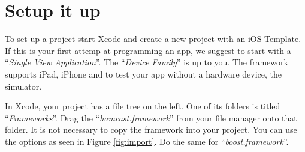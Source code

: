 \section{Setup it up}
\label{sec:setup}

To set up a project start Xcode and create a new project with an iOS Template. If this is your first attemp at programming an app, we suggest to start with a ``\textit{Single View Application}''. The ``\textit{Device Family}'' is up to you. The framework supports iPad, iPhone and to test your app without a hardware device, the simulator. 

In Xcode, your project has a file tree on the left. One of its folders is titled ``\textit{Frameworks}''. Drag the ``\textit{hamcast.framework}'' from your file manager onto that folder. It is not necessary to copy the framework into your project. You can use the options as seen in Figure \ref{fig:import}. Do the same for ``\textit{boost.framework}''.


